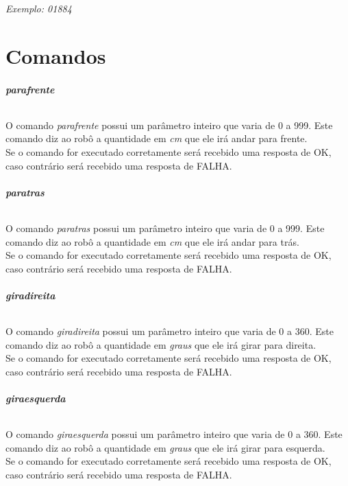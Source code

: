 \documentclass[11pt,a4paper]{article}
\begin{document}
\textsl{Exemplo: 01884} \\ \newline


\part*{Comandos \newline}


\paragraph{\textbf{parafrente} \newline}
O comando \textit{parafrente} possui um parâmetro inteiro que varia de 0 a 999.  
Este comando diz ao robô a quantidade em \textit{cm} que ele irá andar para frente.\\
Se o comando for executado corretamente será recebido uma resposta de OK, caso contrário será recebido uma resposta de FALHA. \\


\paragraph{\textbf{paratras} \newline}
O comando \textit{paratras} possui um parâmetro inteiro que varia de 0 a 999. 
Este comando diz ao robô a quantidade em \textit{cm} que ele irá andar para trás.\\
Se o comando for executado corretamente será recebido uma resposta de OK, caso contrário será recebido uma resposta de FALHA. \\


\paragraph{\textbf{giradireita} \newline}
O comando \textit{giradireita} possui um parâmetro inteiro que varia de 0 a 360.  
Este comando diz ao robô a quantidade em \textit{graus} que ele irá girar para direita.\\
Se o comando for executado corretamente será recebido uma resposta de OK, caso contrário será recebido uma resposta de FALHA. \\

\paragraph{\textbf{giraesquerda} \newline}
O comando \textit{giraesquerda} possui um parâmetro inteiro que varia de 0 a 360.
Este comando diz ao robô a quantidade em \textit{graus} que ele irá girar para esquerda.\\
Se o comando for executado corretamente será recebido uma resposta de OK, caso contrário será recebido uma resposta de FALHA. \\
\end{document}
